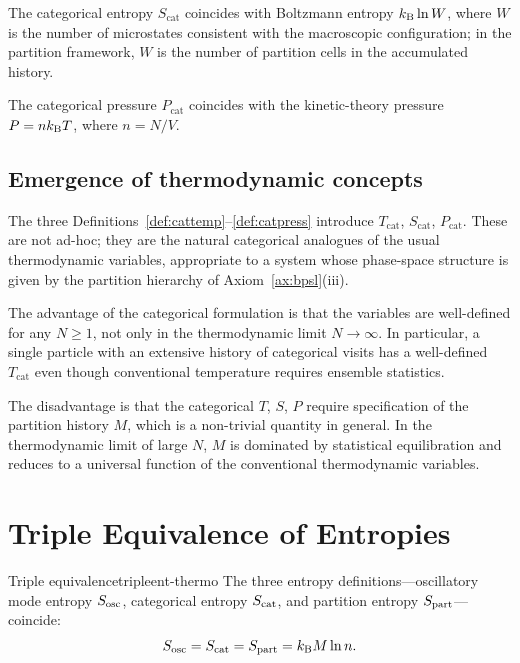 The categorical entropy $S_{\text{cat}}$ coincides with Boltzmann entropy $k_{\mathrm{B}}\ln W$, where $W$ is the number of microstates consistent with the macroscopic configuration; in the partition framework, $W$ is the number of partition cells in the accumulated history.

The categorical pressure $P_{\text{cat}}$ coincides with the kinetic-theory pressure $P=nk_{\mathrm{B}} T$, where $n=N/V$.

\subsection{Emergence of thermodynamic concepts}

The three Definitions~\ref{def:cattemp}--\ref{def:catpress} introduce $T_{\text{cat}}$, $S_{\text{cat}}$, $P_{\text{cat}}$. These are not ad-hoc; they are the natural categorical analogues of the usual thermodynamic variables, appropriate to a system whose phase-space structure is given by the partition hierarchy of Axiom~\ref{ax:bpsl}(iii).

The advantage of the categorical formulation is that the variables are well-defined for any $N\ge 1$, not only in the thermodynamic limit $N\to\infty$. In particular, a single particle with an extensive history of categorical visits has a well-defined $T_{\text{cat}}$ even though conventional temperature requires ensemble statistics.

The disadvantage is that the categorical $T$, $S$, $P$ require specification of the partition history $M$, which is a non-trivial quantity in general. In the thermodynamic limit of large $N$, $M$ is dominated by statistical equilibration and reduces to a universal function of the conventional thermodynamic variables.

\section{Triple Equivalence of Entropies}
\label{sec:tripleent}

\begin{consequence}{Triple equivalence}{tripleent-thermo}
The three entropy definitions---oscillatory mode entropy $S_{\mathrm{osc}}$, categorical entropy $S_{\mathrm{cat}}$, and partition entropy $S_{\mathrm{part}}$---coincide:
\begin{equation}
S_{\mathrm{osc}}=S_{\mathrm{cat}}=S_{\mathrm{part}}=k_{\mathrm{B}} M\ln n.
\label{eq:triple}
\end{equation}
\end{consequence}

